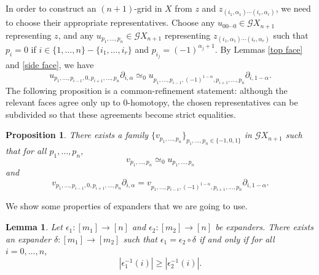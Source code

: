 \documentclass[oneside, 12pt]{amsart}
\numberwithin{equation}{section}
\theoremstyle{plain}
\newtheorem{proposition}[theorem]{Proposition}
\newtheorem{lemma}[theorem]{Lemma}
\theoremstyle{definition}
\theoremstyle{remark}
\begin{document}
	
	
	
	
	
	
	
	
	
	
	In order to construct an $(n+1)$-grid in $X$ from $z$ and $z_{(i_1,\alpha_1)\cdots(i_r,\alpha_r)}$, we need to choose their appropriate representatives. Choose any $u_{00\cdots0}\in\mathcal{G}X_{n+1}$ representing $z$, and any $u_{p_1,\ldots,p_n}\in\mathcal{G}X_{n+1}$ representing $z_{(i_1,\alpha_1)\cdots(i_r,\alpha_r)}$ such that $p_i=0$ if $i\in\{1,\ldots,n\}-\{i_1,\ldots,i_r\}$ and $p_{i_j}=(-1)^{\alpha_j+1}$. By Lemmas \ref{top face} and \ref{side face}, we have
	\[
	u_{p_1,\ldots,p_{i-1},0,p_{i+1},\ldots,p_n}\partial_{i,\alpha}\simeq_0u_{p_1,\ldots,p_{i-1},(-1)^{1-\alpha},p_{i+1},\ldots,p_n}\partial_{i,1-\alpha}.
	\]
	The following proposition is a common-refinement statement: although the relevant faces agree only up to 0-homotopy, the chosen representatives can be subdivided so that these agreements become strict equalities.
	
	
	
	\begin{proposition}
		\label{gluing grids}
		There exists a family $\{v_{p_1,\ldots,p_n}\}_{p_1,\ldots,p_n\in\{-1,0,1\}}$ in $\mathcal{G}X_{n+1}$ such that for all $p_1,\ldots,p_n$,
		\[
		v_{p_1,\ldots,p_n}\simeq_0 u_{p_1,\ldots,p_n}
		\]
		and
		\[
		v_{p_1,\ldots,p_{i-1},0,p_{i+1},\ldots,p_n}\partial_{i,\alpha}=v_{p_1,\ldots,p_{i-1},(-1)^{1-\alpha},p_{i+1},\ldots,p_n}\partial_{i,1-\alpha}.
		\]
	\end{proposition}
	
	
	
	We show some properties of expanders that we are going to use.
	
	
	
	\begin{lemma}
		\label{cofinality lemma}
		Let $\epsilon_1\colon[m_1]\to[n]$ and $\epsilon_2\colon[m_2]\to[n]$ be expanders. There exists an expander $\delta\colon[m_1]\to[m_2]$ such that $\epsilon_1=\epsilon_2\circ\delta$ if and only if for all $i=0,\ldots,n$,
		\[
		|\epsilon_1^{-1}(i)|\ge|\epsilon_2^{-1}(i)|.
		\]
	\end{lemma}
	
\end{document}
